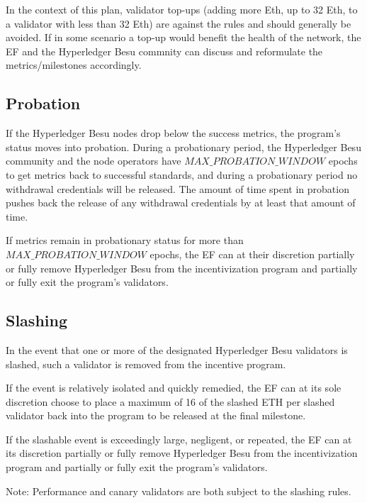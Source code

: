 In the context of this plan, validator top-ups (adding more Eth, up to 32 Eth, to a validator with less than 32 Eth) are against the rules and should generally be avoided. If in some scenario a top-up would benefit the health of the network, the EF and the Hyperledger Besu commnity can discuss and reformulate the metrics/milestones accordingly.

\subsection{Probation}
If the Hyperledger Besu nodes drop below the success metrics, the program's status moves into probation. During a probationary period, the Hyperledger Besu community and the node operators have $MAX\_PROBATION\_WINDOW$ epochs to get metrics back to successful standards, and during a probationary period no withdrawal credentials will be released. The amount of time spent in probation pushes back the release of any withdrawal credentials by at least that amount of time.

If metrics remain in probationary status for more than $MAX\_PROBATION\_WINDOW$ epochs, the EF can at their discretion partially or fully remove Hyperledger Besu from the incentivization program and partially or fully exit the program’s validators.

\subsection{Slashing}
In the event that one or more of the designated Hyperledger Besu validators is slashed, such a validator is removed from the incentive program.

If the event is relatively isolated and quickly remedied, the EF can at its sole discretion choose to place a maximum of 16 of the slashed ETH per slashed validator back into the program to be released at the final milestone.

If the slashable event is exceedingly large, negligent, or repeated, the EF can at its discretion partially or fully remove Hyperledger Besu from the incentivization program and partially or fully exit the program’s validators.

Note: Performance and canary validators are both subject to the slashing rules.

